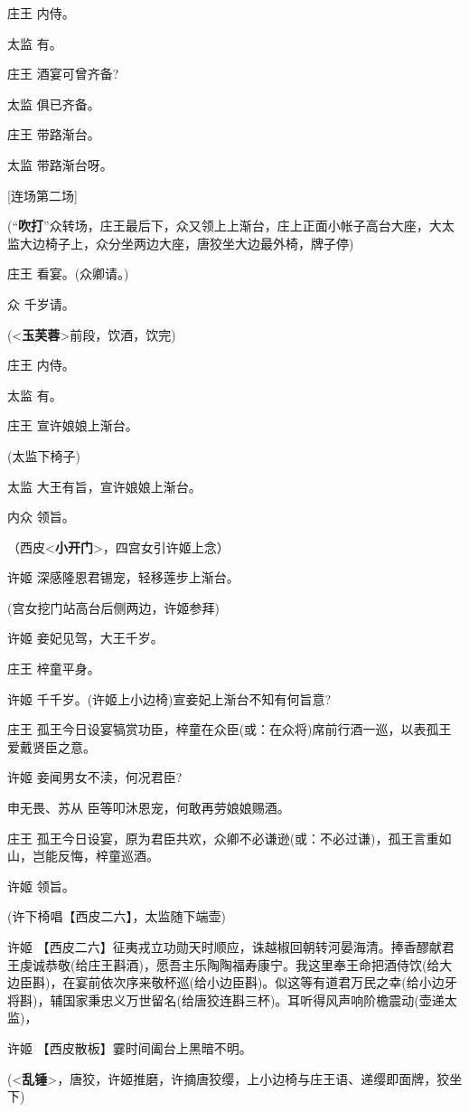 庄王 内侍。

太监 有。

庄王 酒宴可曾齐备?

太监 俱已齐备。

庄王 带路渐台。

太监 带路渐台呀。

{[}连场第二场{]}

(``\textbf{吹打}''众转场，庄王最后下，众又领上上渐台，庄上正面小帐子高台大座，大太监大边椅子上，众分坐两边大座，唐狡坐大边最外椅，牌子停)

庄王 看宴。(众卿请。)

众 千岁请。

(\textless{}\textbf{玉芙蓉}\textgreater{}前段，饮酒，饮完)

庄王 内侍。

太监 有。

庄王 宣许娘娘上渐台。

(太监下椅子)

太监 大王有旨，宣许娘娘上渐台。

内众 领旨。

（西皮\textless{}\textbf{小开门}\textgreater{}，四宫女引许姬上念）

许姬 深感隆恩君锡宠，轻移莲步上渐台。

(宫女挖门站高台后侧两边，许姬参拜)

许姬 妾妃见驾，大王千岁。

庄王 梓童平身。

许姬 千千岁。(许姬上小边椅)宣妾妃上渐台不知有何旨意?

庄王
孤王今日设宴犒赏功臣，梓童在众臣(或：在众将)席前行酒一巡，以表孤王爱戴贤臣之意。

许姬 妾闻男女不渎，何况君臣?

申无畏、苏从 臣等叩沐恩宠，何敢再劳娘娘赐酒。

庄王
孤王今日设宴，原为君臣共欢，众卿不必谦逊(或：不必过谦)，孤王言重如山，岂能反悔，梓童巡酒。

许姬 领旨。

(许下椅唱【西皮二六】，太监随下端壶)

许姬
【西皮二六】征夷戎立功勋天时顺应，诛越椒回朝转河晏海清。捧香醪献君王虔诚恭敬(给庄王斟酒)，愿吾主乐陶陶福寿康宁。我这里奉王命把酒侍饮(给大边臣斟)，在宴前依次序来敬杯巡(给小边臣斟)。似这等有道君万民之幸(给小边牙将斟)，辅国家秉忠义万世留名(给唐狡连斟三杯)。耳听得风声响阶檐震动(壶递太监)，

许姬 【西皮散板】霎时间阖台上黑暗不明。

(\textless{}\textbf{乱锤}\textgreater{}，唐狡，许姬推磨，许摘唐狡缨，上小边椅与庄王语、递缨即面牌，狡坐下)

